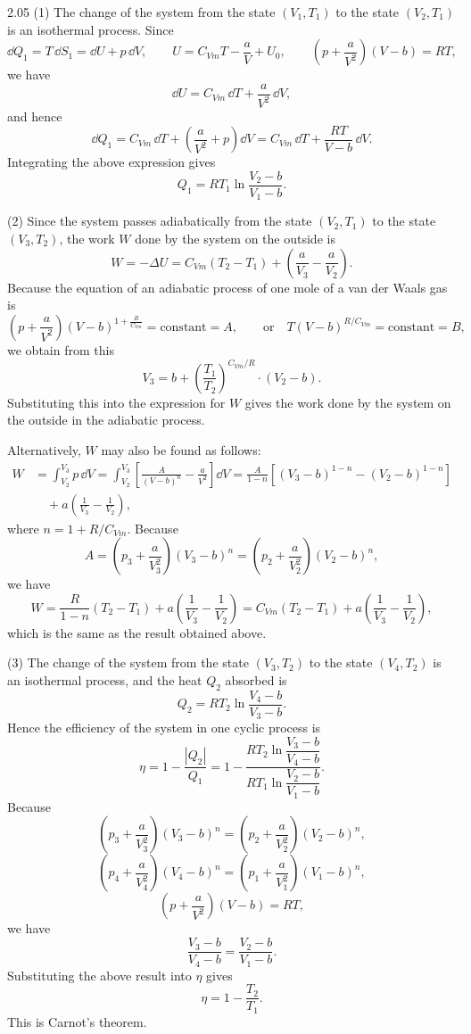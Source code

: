 \begin{solution}{2.05}
(1) The change of the system from the state $(V_1,T_1)$ to the state $(V_2,T_1)$ is an isothermal process. Since
\[
\dd Q_1=T\,\dd S_1=\dd U+p\,\dd V,
\qquad
U=C_{Vm}T-\frac{a}{V}+U_0,
\qquad
\left(p+\frac{a}{V^2}\right)(V-b)=RT,
\]
we have
\[
\dd U=C_{Vm}\,\dd T+\frac{a}{V^2}\,\dd V,
\]
and hence
\[
\dd Q_1=C_{Vm}\,\dd T+\left(\frac{a}{V^2}+p\right)\dd V=C_{Vm}\,\dd T+\frac{RT}{V-b}\,\dd V.
\]
Integrating the above expression gives
\[
Q_1=RT_1\ln\frac{V_2-b}{V_1-b}.
\]

(2) Since the system passes adiabatically from the state $(V_2,T_1)$ to the state $(V_3,T_2)$, the work $W$ done by the system on the outside is
\[
W=-\Delta U=C_{Vm}(T_2-T_1)+\left(\frac{a}{V_3}-\frac{a}{V_2}\right).
\]
Because the equation of an adiabatic process of one mole of a van der Waals gas is
\[
\left(p+\frac{a}{V^2}\right)(V-b)^{1+\frac{R}{C_{Vm}}}=\text{constant}=A,
\qquad
\text{or}\quad
T(V-b)^{R/C_{Vm}}=\text{constant}=B,
\]
we obtain from this
\[
V_3=b+\left(\frac{T_1}{T_2}\right)^{C_{Vm}/R}\cdot(V_2-b).
\]
Substituting this into the expression for $W$ gives the work done by the system on the outside in the adiabatic process.

Alternatively, $W$ may also be found as follows:
\[
\begin{aligned}
W&=\int_{V_2}^{V_3}p\,\dd V=\int_{V_2}^{V_3}\left[\frac{A}{(V-b)^n}-\frac{a}{V^2}\right]\dd V
=\frac{A}{1-n}\left[(V_3-b)^{1-n}-(V_2-b)^{1-n}\right]\\[2pt]
&\quad +a\left(\frac{1}{V_3}-\frac{1}{V_2}\right),
\end{aligned}
\]
where $n=1+R/C_{Vm}$. Because
\[
A=\left(p_3+\frac{a}{V_3^2}\right)(V_3-b)^n=\left(p_2+\frac{a}{V_2^2}\right)(V_2-b)^n,
\]
we have
\[
W=\frac{R}{1-n}(T_2-T_1)+a\left(\frac{1}{V_3}-\frac{1}{V_2}\right)
=C_{Vm}(T_2-T_1)+a\left(\frac{1}{V_3}-\frac{1}{V_2}\right),
\]
which is the same as the result obtained above.

(3) The change of the system from the state $(V_3,T_2)$ to the state $(V_4,T_2)$ is an isothermal process, and the heat $Q_2$ absorbed is
\[
Q_2=RT_2\ln\frac{V_4-b}{V_3-b}.
\]
Hence the efficiency of the system in one cyclic process is
\[
\eta=1-\frac{|Q_2|}{Q_1}
=1-\frac{RT_2\ln\dfrac{V_3-b}{V_4-b}}{RT_1\ln\dfrac{V_2-b}{V_1-b}}.
\]
Because
\[
\left(p_3+\frac{a}{V_3^2}\right)(V_3-b)^n=\left(p_2+\frac{a}{V_2^2}\right)(V_2-b)^n,
\]
\[
\left(p_4+\frac{a}{V_4^2}\right)(V_4-b)^n=\left(p_1+\frac{a}{V_1^2}\right)(V_1-b)^n,
\]
\[
\left(p+\frac{a}{V^2}\right)(V-b)=RT,
\]
we have
\[
\frac{V_3-b}{V_4-b}=\frac{V_2-b}{V_1-b}.
\]
Substituting the above result into $\eta$ gives
\[
\eta=1-\frac{T_2}{T_1}.
\]
This is Carnot's theorem.
\end{solution}

